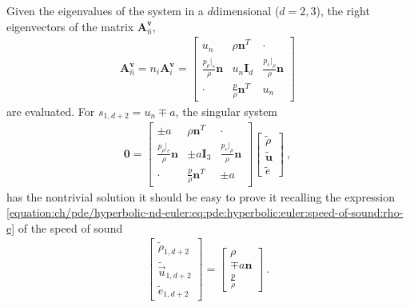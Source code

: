 \documentclass[letterpaper,10pt,english]{jupyterBook}
\begin{document}
\sphinxAtStartPar
Given the eigenvalues of the system in a \(d\)\sphinxhyphen{}dimensional (\(d = 2, 3\)), the right eigenvectors of the matrix \(\mathbf{A}^{\mathbf{v}}_{\hat{n}}\),
\begin{equation*}
\begin{split}
\mathbf{A}^{\mathbf{v}}_{\hat{n}} = n_i \mathbf{A}^\mathbf{v}_i =
\begin{bmatrix}
  u_n & \rho \mathbf{n}^T & \cdot \\
  \frac{p_\rho|_s}{\rho} \mathbf{n} & u_n \mathbf{I}_d &  \frac{p_s|_\rho}{\rho} \mathbf{n} \\
  \cdot & \frac{p}{\rho}\mathbf{n}^T & u_n
\end{bmatrix}
\end{split}
\end{equation*}
\sphinxAtStartPar
are evaluated. For \(s_{1,d+2} = u_n \mp a\), the singular system
\begin{equation*}
\begin{split}\mathbf{0} = 
\begin{bmatrix}
  \pm a & \rho \mathbf{n}^T & \cdot \\
  \frac{p_\rho|_e}{\rho} \mathbf{n} & \pm a \mathbf{I}_3 &  \frac{p_e|_\rho}{\rho} \mathbf{n} \\
  \cdot & \frac{p}{\rho}\mathbf{n}^T & \pm a
\end{bmatrix} \begin{bmatrix} \tilde{\rho} \\ \tilde{\mathbf{u}} \\ \tilde{e} \end{bmatrix} \ ,
\end{split}
\end{equation*}
\sphinxAtStartPar
has the non\sphinxhyphen{}trivial solution \sphinxhyphen{} it should be easy to prove it recalling the expression \eqref{equation:ch/pde/hyperbolic-nd-euler:eq:pde:hyperbolic:euler:speed-of-sound:rho-e} of the speed of sound
\begin{equation*}
\begin{split}
\begin{bmatrix} \tilde{\rho}_{1,d+2} \\ \tilde{\vec{u}}_{1,d+2} \\ \tilde{e}_{1,d+2} \end{bmatrix} =
\begin{bmatrix} \rho \\ \mp a \mathbf{n} \\ \frac{p}{\rho} \end{bmatrix} \ .
\end{split}
\end{equation*}
\end{document}
